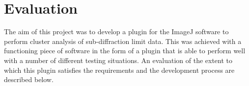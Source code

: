 
\part{Evaluation}
\label{prt:evaluation}

The aim of this project was to develop a plugin for the ImageJ software to
perform cluster analysis of sub-diffraction limit data. This was achieved with
a functioning piece of software in the form of a plugin that is able to perform
well with a number of different testing situations. An evaluation of the extent
to which this plugin satisfies the requirements and the development process are
described below.

